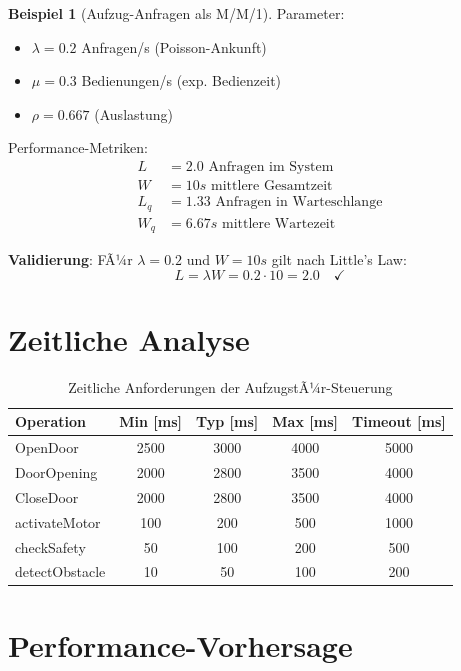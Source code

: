 ﻿\documentclass[a4paper,12pt]{report}
\theoremstyle{definition}
\newtheorem{beispiel}{Beispiel}[section]
\begin{document}
\begin{beispiel}[Aufzug-Anfragen als M/M/1]
	Parameter:
	\begin{itemize}
		\item[-] $\lambda = 0.2$ Anfragen/s (Poisson-Ankunft)
		\item[-] $\mu = 0.3$ Bedienungen/s (exp. Bedienzeit)
		\item[-] $\rho = 0.667$ (Auslastung)
	\end{itemize}
	
	Performance-Metriken:
	\begin{align*}
		L &= 2.0 \text{ Anfragen im System} \\
		W &= 10s \text{ mittlere Gesamtzeit} \\
		L_q &= 1.33 \text{ Anfragen in Warteschlange} \\
		W_q &= 6.67s \text{ mittlere Wartezeit}
	\end{align*}
	
	\textbf{Validierung}: FÃ¼r $\lambda = 0.2$ und $W = 10s$ gilt nach Little's Law:
	\[
	L = \lambda W = 0.2 \cdot 10 = 2.0 \quad \checkmark
	\]
\end{beispiel}

\section{Zeitliche Analyse}

\begin{table}[h]
	\centering
	\begin{tabular}{@{}lcccc@{}}
		\toprule
		\textbf{Operation} & \textbf{Min [ms]} & \textbf{Typ [ms]} & \textbf{Max [ms]} & \textbf{Timeout [ms]} \\
		\midrule
		OpenDoor & 2500 & 3000 & 4000 & 5000 \\
		DoorOpening & 2000 & 2800 & 3500 & 4000 \\
		CloseDoor & 2000 & 2800 & 3500 & 4000 \\
		activateMotor & 100 & 200 & 500 & 1000 \\
		checkSafety & 50 & 100 & 200 & 500 \\
		detectObstacle & 10 & 50 & 100 & 200 \\
		\bottomrule
	\end{tabular}
	\caption{Zeitliche Anforderungen der AufzugstÃ¼r-Steuerung}
	\label{tab:timing-analysis}
\end{table}

\section{Performance-Vorhersage}
\end{document}
